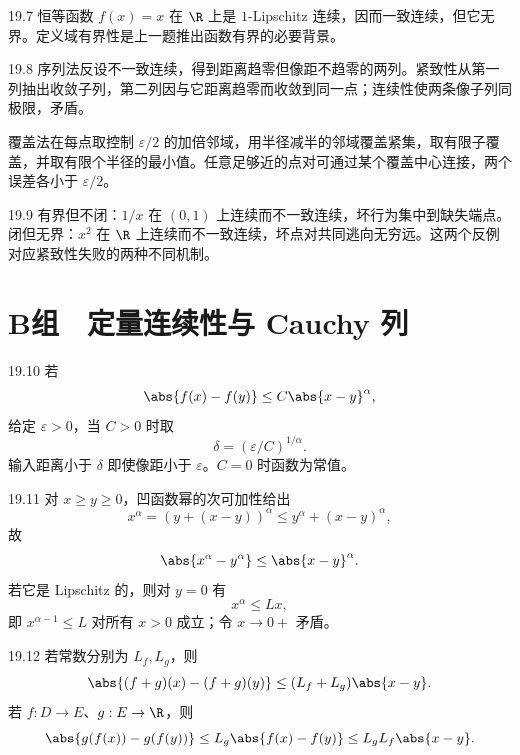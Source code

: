 \begin{solution}{19.7}
恒等函数 \(f(x)=x\) 在 \(\R\) 上是 \(1\)-Lipschitz 连续，因而一致连续，但它无界。定义域有界性是上一题推出函数有界的必要背景。
\end{solution}

\begin{solution}{19.8}
序列法反设不一致连续，得到距离趋零但像距不趋零的两列。紧致性从第一列抽出收敛子列，第二列因与它距离趋零而收敛到同一点；连续性使两条像子列同极限，矛盾。

覆盖法在每点取控制 \(\varepsilon/2\) 的加倍邻域，用半径减半的邻域覆盖紧集，取有限子覆盖，并取有限个半径的最小值。任意足够近的点对可通过某个覆盖中心连接，两个误差各小于 \(\varepsilon/2\)。
\end{solution}

\begin{solution}{19.9}
有界但不闭：\(1/x\) 在 \((0,1)\) 上连续而不一致连续，坏行为集中到缺失端点。闭但无界：\(x^2\) 在 \(\R\) 上连续而不一致连续，坏点对共同逃向无穷远。这两个反例对应紧致性失败的两种不同机制。
\end{solution}

\section*{B组　定量连续性与 Cauchy 列}

\begin{solution}{19.10}
若
\[
 \abs{f(x)-f(y)}\le C\abs{x-y}^{\alpha},
\]
给定 \(\varepsilon>0\)，当 \(C>0\) 时取
\[
 \delta=(\varepsilon/C)^{1/\alpha}.
\]
输入距离小于 \(\delta\) 即使像距小于 \(\varepsilon\)。\(C=0\) 时函数为常值。
\end{solution}

\begin{solution}{19.11}
对 \(x\ge y\ge0\)，凹函数幂的次可加性给出
\[
 x^\alpha=(y+(x-y))^\alpha\le y^\alpha+(x-y)^\alpha,
\]
故
\[
 \abs{x^\alpha-y^\alpha}\le\abs{x-y}^\alpha.
\]
若它是 Lipschitz 的，则对 \(y=0\) 有
\[
 x^\alpha\le Lx,
\]
即 \(x^{\alpha-1}\le L\) 对所有 \(x>0\) 成立；令 \(x\to0+\) 矛盾。
\end{solution}

\begin{solution}{19.12}
若常数分别为 \(L_f,L_g\)，则
\[
 \abs{(f+g)(x)-(f+g)(y)}
 \le(L_f+L_g)\abs{x-y}.
\]
若 \(f:D\to E\)、\(g:E\to\R\)，则
\[
 \abs{g(f(x))-g(f(y))}
 \le L_g\abs{f(x)-f(y)}
 \le L_gL_f\abs{x-y}.
\]
\end{solution}


